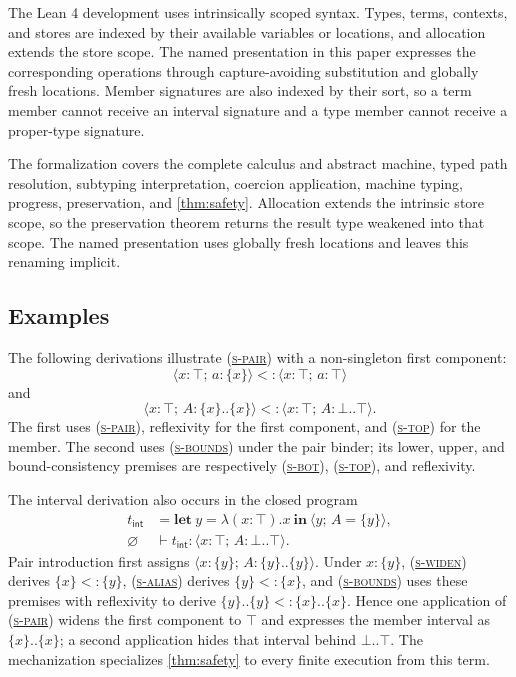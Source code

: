 \documentclass[acmsmall,screen,nonacm]{acmart}
\newcommand{\ruleref}[1]{%
  \textsc{(\hyperref[rule:#1]{#1})}}
\newcommand{\ctxempty}{\varnothing}
\newcommand{\sing}[1]{\{#1\}}
\newcommand{\pairty}[4]{\langle #1\!:\!#2;\,#3\!:\!#4\rangle}
\newcommand{\pairval}[3]{\langle #1;\,#2=#3\rangle}
\begin{document}
The Lean 4 development \citep{demoura2021lean4} uses intrinsically scoped
syntax. Types, terms, contexts, and stores are indexed by their available
variables or locations, and allocation extends the store scope. The named
presentation in this paper expresses the corresponding operations through
capture-avoiding substitution and globally fresh locations. Member signatures
are also indexed by their sort, so a term member cannot receive an interval
signature and a type member cannot receive a proper-type signature.

The formalization covers the complete calculus and abstract machine, typed
path resolution, subtyping interpretation, coercion application, machine
typing, progress, preservation, and \cref{thm:safety}. Allocation extends the
intrinsic store scope, so the preservation theorem returns the result type
weakened into that scope. The named presentation uses globally fresh
locations and leaves this renaming implicit.

\subsection{Examples}

The following derivations illustrate \ruleref{s-pair} with a non-singleton
first component:
\[
  \pairty{x}{\top}{a}{\sing{x}}
  <:
  \pairty{x}{\top}{a}{\top}
\]
and
\[
  \pairty{x}{\top}{A}{\sing{x}..\sing{x}}
  <:
  \pairty{x}{\top}{A}{\bot..\top}.
\]
The first uses \ruleref{s-pair}, reflexivity for the first component, and
\ruleref{s-top} for the member. The second uses \ruleref{s-bounds} under the
pair binder; its lower, upper, and bound-consistency premises are respectively
\ruleref{s-bot}, \ruleref{s-top}, and reflexivity.

The interval derivation also occurs in the closed program
\[
\begin{aligned}
t_{\mathsf{int}}
  &={\mathbf{let}\ y=\lambda(x:\top).x\ \mathbf{in}\
      \pairval{y}{A}{\sing{y}}},
\\
\ctxempty&\vdash t_{\mathsf{int}}:
  \pairty{x}{\top}{A}{\bot..\top}.
\end{aligned}
\]
Pair introduction first assigns
\(\pairty{x}{\sing{y}}{A}{\sing{y}..\sing{y}}\). Under
\(x:\sing y\), \ruleref{s-widen} derives
\(\sing x<:\sing y\), \ruleref{s-alias} derives
\(\sing y<:\sing x\), and \ruleref{s-bounds} uses these premises with
reflexivity to derive
\(\sing y..\sing y<:\sing x..\sing x\). Hence one application of
\ruleref{s-pair} widens the first component to \(\top\) and expresses the
member interval as \(\sing{x}..\sing{x}\); a second application hides that
interval behind \(\bot..\top\). The mechanization specializes
\cref{thm:safety} to every finite execution from this term.
\end{document}
